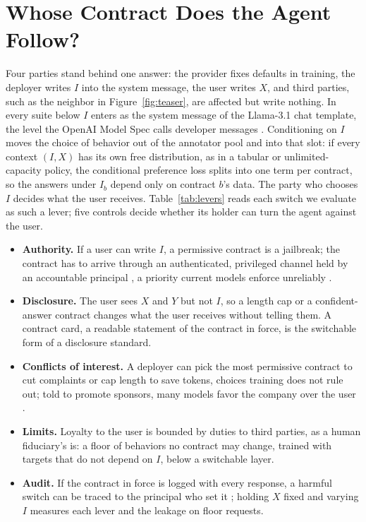 \documentclass[letterpaper]{article} %
\begin{document}
\section{Whose Contract Does the Agent Follow?}
\label{sec:loyalty}

Four parties stand behind one answer: the provider fixes defaults in training, the deployer writes $I$ into the system message, the user writes $X$, and third parties, such as the neighbor in Figure~\ref{fig:teaser}, are affected but write nothing. In every suite below $I$ enters as the system message of the Llama-3.1 chat template, the level the OpenAI Model Spec calls developer messages \cite{openai2025modelspec}. Conditioning on $I$ moves the choice of behavior out of the annotator pool and into that slot: if every context $(I,X)$ has its own free distribution, as in a tabular or unlimited-capacity policy, the conditional preference loss splits into one term per contract, so the answers under $I_b$ depend only on contract $b$'s data. The party who chooses $I$ decides what the user receives. Table~\ref{tab:levers} reads each switch we evaluate as such a lever; five controls decide whether its holder can turn the agent against the user.
\begin{itemize}
    \item \textbf{Authority.} If a user can write $I$, a permissive contract is a jailbreak; the contract has to arrive through an authenticated, privileged channel held by an accountable principal \cite{wallace2024instruction,south2025authenticated}, a priority current models enforce unreliably \cite{geng2025control,zhang2025iheval}.
    \item \textbf{Disclosure.} The user sees $X$ and $Y$ but not $I$, so a length cap or a confident-answer contract changes what the user receives without telling them. A contract card, a readable statement of the contract in force, is the switchable form of a disclosure standard.
    \item \textbf{Conflicts of interest.} A deployer can pick the most permissive contract to cut complaints or cap length to save tokens, choices training does not rule out; told to promote sponsors, many models favor the company over the user \cite{wu2026ads}.
    \item \textbf{Limits.} Loyalty to the user is bounded by duties to third parties, as a human fiduciary's is: a floor of behaviors no contract may change, trained with targets that do not depend on $I$, below a switchable layer.
    \item \textbf{Audit.} If the contract in force is logged with every response, a harmful switch can be traced to the principal who set it \cite{chan2024visibility}; holding $X$ fixed and varying $I$ measures each lever and the leakage on floor requests.
\end{itemize}
\end{document}
